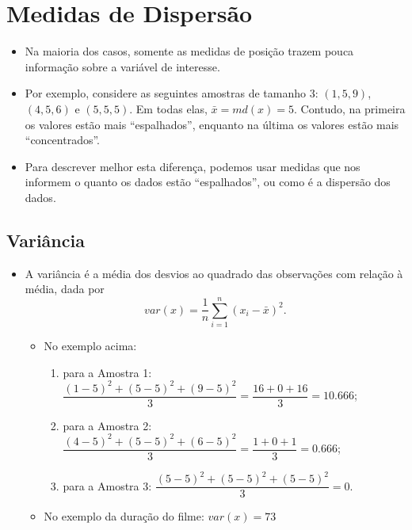 \documentclass[
]{book}
\providecommand{\tightlist}{%
  \setlength{\itemsep}{0pt}\setlength{\parskip}{0pt}}
\begin{document}
\section{Medidas de Dispersão}\label{medidas-de-dispersuxe3o}

\begin{itemize}
\tightlist
\item
  Na maioria dos casos, somente as medidas de posição trazem pouca informação sobre a variável de interesse.\\
\item
  Por exemplo, considere as seguintes amostras de tamanho 3: \((1,5,9)\), \((4,5,6)\) e \((5,5,5)\). Em todas elas, \(\bar{x}=md(x)=5\). Contudo, na primeira os valores estão mais ``espalhados'', enquanto na última os valores estão mais ``concentrados''.\\
\item
  Para descrever melhor esta diferença, podemos usar medidas que nos informem o quanto os dados estão ``espalhados'', ou como é a dispersão dos dados.
\end{itemize}

\subsection{Variância}\label{variuxe2ncia}

\begin{itemize}
\tightlist
\item
  A variância é a média dos desvios ao quadrado das observações com relação à média, dada por \[var(x) = \frac{1}{n}\sum_{i=1}^n \left(x_i - \bar{x}\right)^2.\]

  \begin{itemize}
  \tightlist
  \item
    No exemplo acima:

    \begin{enumerate}
    \def\labelenumi{\arabic{enumi}.}
    \tightlist
    \item
      para a Amostra 1: \(\dfrac{(1-5)^2+(5-5)^2+(9-5)^2}{3}=\dfrac{16+0+16}{3}=10.666\);
    \item
      para a Amostra 2: \(\dfrac{(4-5)^2+(5-5)^2+(6-5)^2}{3}=\dfrac{1+0+1}{3}=0.666\);
    \item
      para a Amostra 3: \(\dfrac{(5-5)^2+(5-5)^2+(5-5)^2}{3}=0\).
    \end{enumerate}
  \item
    No exemplo da duração do filme: \(var(x) = 73\)
  \end{itemize}
\end{itemize}
\end{document}
